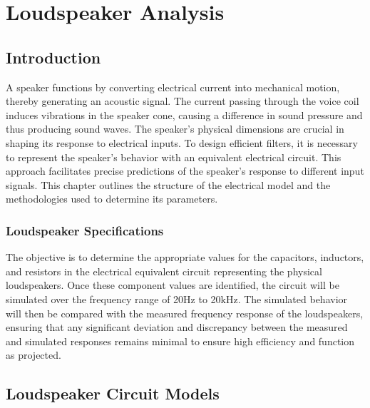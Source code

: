\chapter{Loudspeaker Analysis}
\label{chapter:LoudspeakerAnalysis}

\section{Introduction}
A speaker functions by converting electrical current into mechanical motion, thereby generating an acoustic signal. The current passing through the voice coil induces vibrations in the speaker cone, causing a difference in sound pressure and thus producing sound waves. The speaker's physical dimensions are crucial in shaping its response to electrical inputs. To design efficient filters, it is necessary to represent the speaker's behavior with an equivalent electrical circuit. This approach facilitates precise predictions of the speaker's response to different input signals. This chapter outlines the structure of the electrical model and the methodologies used to determine its parameters.

\subsection{Loudspeaker Specifications}
The objective is to determine the appropriate values for the capacitors, inductors, and resistors in the electrical equivalent circuit representing the physical loudspeakers. Once these component values are identified, the circuit will be simulated over the frequency range of 20Hz to 20kHz. The simulated behavior will then be compared with the measured frequency response of the loudspeakers, ensuring that any significant deviation and discrepancy between the measured and simulated responses remains minimal to ensure high efficiency and function as projected.

\section{Loudspeaker Circuit Models}
